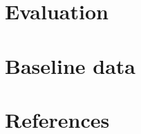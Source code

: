 \documentclass[a4paper,11pt]{article}
\begin{document}
\section{Evaluation}


\begin{appendices}
    \label{appendix}
    \section{Baseline data}
    \label{sec:baseline data}
\end{appendices}

\section{References}


\end{document}
